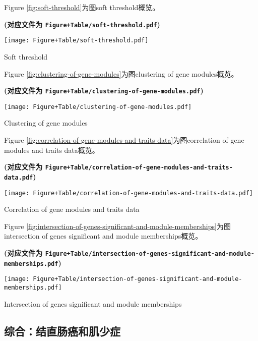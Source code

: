 \documentclass[
]{article}
\begin{document}
Figure \ref{fig:soft-threshold}为图soft threshold概览。

\textbf{(对应文件为 \texttt{Figure+Table/soft-threshold.pdf})}

\def\@captype{figure}
\begin{center}
\texttt{[image: Figure+Table/soft-threshold.pdf]}
\caption{Soft threshold}\label{fig:soft-threshold}
\end{center}

Figure \ref{fig:clustering-of-gene-modules}为图clustering of gene modules概览。

\textbf{(对应文件为 \texttt{Figure+Table/clustering-of-gene-modules.pdf})}

\def\@captype{figure}
\begin{center}
\texttt{[image: Figure+Table/clustering-of-gene-modules.pdf]}
\caption{Clustering of gene modules}\label{fig:clustering-of-gene-modules}
\end{center}

Figure \ref{fig:correlation-of-gene-modules-and-traits-data}为图correlation of gene modules and traits data概览。

\textbf{(对应文件为 \texttt{Figure+Table/correlation-of-gene-modules-and-traits-data.pdf})}

\def\@captype{figure}
\begin{center}
\texttt{[image: Figure+Table/correlation-of-gene-modules-and-traits-data.pdf]}
\caption{Correlation of gene modules and traits data}\label{fig:correlation-of-gene-modules-and-traits-data}
\end{center}

Figure \ref{fig:intersection-of-genes-significant-and-module-memberships}为图intersection of genes significant and module memberships概览。

\textbf{(对应文件为 \texttt{Figure+Table/intersection-of-genes-significant-and-module-memberships.pdf})}

\def\@captype{figure}
\begin{center}
\texttt{[image: Figure+Table/intersection-of-genes-significant-and-module-memberships.pdf]}
\caption{Intersection of genes significant and module memberships}\label{fig:intersection-of-genes-significant-and-module-memberships}
\end{center}

\hypertarget{ux7efcux5408ux7ed3ux76f4ux80a0ux764cux548cux808cux5c11ux75c7}{%
\subsection{综合：结直肠癌和肌少症}\label{ux7efcux5408ux7ed3ux76f4ux80a0ux764cux548cux808cux5c11ux75c7}}
\end{document}
